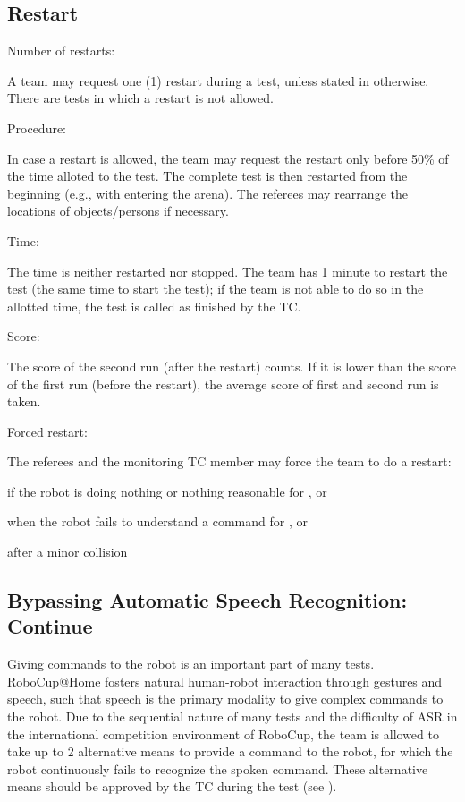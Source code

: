 \subsection{Restart}
\label{rule:restart}
\begin{enumerate}
	{\bf\item Number of restarts:} A team may request one (1) restart during a test, unless stated in otherwise. There are tests in which a restart is not allowed.
	{\bf\item Procedure:} In case a restart is allowed, the team may request the restart only before 50\% of the time alloted to the test. The complete test is then restarted from the beginning (e.g., with entering the arena). The referees may rearrange the locations of objects/persons if necessary.
	{\bf\item Time:} The time is neither restarted nor stopped. The team has 1 minute to restart the test (the same time to start the test); if the team is not able to do so in the allotted time, the test is called as finished by the TC.
	{\bf\item Score:} The score of the second run (after the restart) counts. If it is lower than the score of the first run (before the restart), the average score of first and second run is taken.
	{\bf\item Forced restart:} The referees and the monitoring TC member may force the team to do a restart:
	\begin{compactitem}
		\item if the robot is doing nothing or nothing reasonable for , or
		\item when the robot fails to understand a command for , or
		\item after a minor collision
	\end{compactitem}  
\end{enumerate}


\subsection{Bypassing Automatic Speech Recognition: Continue}
\label{rule:asrcontinue}

Giving commands to the robot is an important part of many tests. RoboCup@Home fosters natural human-robot interaction through gestures and speech, such that speech is the primary modality to give complex commands to the robot. Due to the sequential nature of many tests and the difficulty of ASR in the international competition environment of RoboCup, the team is allowed to take up to 2 alternative means to provide a command to the robot, for which the robot continuously fails to recognize the spoken command. These alternative means should be
approved by the TC during the  test (see ).

